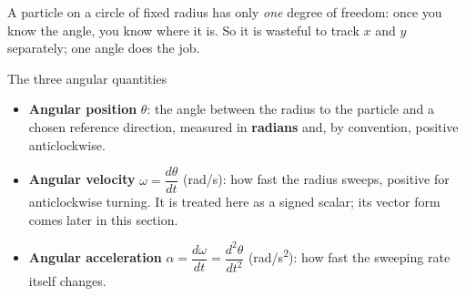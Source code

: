 A particle on a circle of fixed radius has only \emph{one} degree of freedom: once you know the angle,
you know where it is. So it is wasteful to track $x$ and $y$ separately; one angle does the job.

\begin{defbox}{The three angular quantities}
\begin{itemize}
\item \textbf{Angular position} $\theta$: the angle between the radius to the particle and a chosen
      reference direction, measured in \textbf{radians} and, by convention, positive anticlockwise.
\item \textbf{Angular velocity} $\omega=\dfrac{d\theta}{dt}$ (\si{rad/s}): how fast the radius sweeps,
      positive for anticlockwise turning. It is treated here as a signed scalar; its vector form
      comes later in this section.
\item \textbf{Angular acceleration} $\alpha=\dfrac{d\omega}{dt}=\dfrac{d^{2}\theta}{dt^{2}}$
      (\si{rad/s^2}): how fast the sweeping rate itself changes.
\end{itemize}
\end{defbox}


\begin{figure}[htbp]
\centering
{}
\end{figure}

